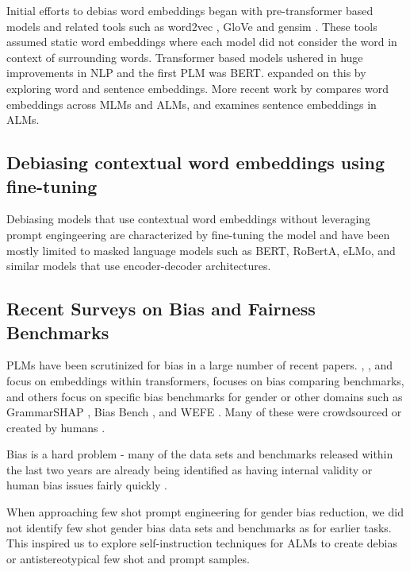 \documentclass[11pt]{article}
\begin{document}
Initial efforts to debias word embeddings \citep{bolukbasi2016man:16,liang2021towards:21,berg2022prompt:22} began with pre-transformer based models and related tools such as word2vec \citep{tenney2020language:20}, GloVe \citep{pennington2014glove:14} and gensim \citep{rehurek_lrec:10}. These tools assumed static word embeddings where each model did not consider the word in context of surrounding words. Transformer based models ushered in huge improvements in NLP and the first PLM was BERT. \citealt{warmerdam-etal-2020-going:20, sevastjanova2022lmfingerprints:22} expanded on this by exploring word and sentence embeddings. More recent work by \citealt{ethayarajh2019contextual:19} compares word embeddings across MLMs and ALMs, and \citealt{muennighoff2022sgpt:22} examines sentence embeddings in ALMs. 

\subsection{Debiasing contextual word embeddings using fine-tuning}

Debiasing models that use contextual word embeddings without leveraging prompt engingeering \citep{zhou2022large:22} are characterized by fine-tuning the model and have been mostly limited to masked language models such as BERT, RoBertA, eLMo, and similar models that use encoder-decoder architectures. 

\subsection{Recent Surveys on Bias and Fairness Benchmarks}
PLMs have been scrutinized for bias in a large number of recent papers. \citealt{zhao2019gender:19}, \citealt{schroder2021evaluating:21}, and \citealt{caliskan2022gender:22} focus on embeddings within transformers, \citealt{delobelle2022measuring:22} focuses on bias comparing benchmarks, and others focus on specific bias benchmarks for gender or other domains such as GrammarSHAP \citep{mosca2022grammarshap:22}, Bias Bench \citep{meade_2022_empirical:22}, and WEFE \citep{wefe2020:20}. Many of these were crowdsourced or created by humans \citep{zhou2022large:22} .

Bias is a hard problem - many of the data sets and benchmarks released within the last two years are already being identified as having internal validity or human bias issues fairly quickly \citep{blodgett-etal-2021-stereotyping:21}.

When approaching few shot prompt engineering for gender bias reduction, we did not identify few shot gender bias data sets and benchmarks as for earlier tasks. This inspired us to explore self-instruction techniques for ALMs to create debias or antistereotypical few shot and prompt samples. 
\end{document}
